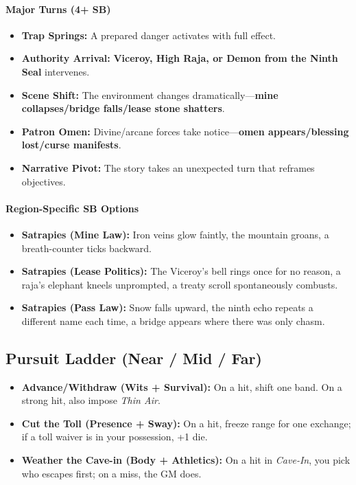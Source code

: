 \paragraph{Major Turns (4+ SB)}
\begin{itemize}
\item \textbf{Trap Springs:} A prepared danger activates with full effect.
\item \textbf{Authority Arrival:} \textbf{Viceroy, High Raja, or Demon from the Ninth Seal} intervenes.
\item \textbf{Scene Shift:} The environment changes dramatically—\textbf{mine collapses/bridge falls/lease stone shatters}.
\item \textbf{Patron Omen:} Divine/arcane forces take notice—\textbf{omen appears/blessing lost/curse manifests}.
\item \textbf{Narrative Pivot:} The story takes an unexpected turn that reframes objectives.
\end{itemize}

\paragraph{Region-Specific SB Options}
\begin{itemize}
\item \textbf{Satrapies (Mine Law):} Iron veins glow faintly, the mountain groans, a breath-counter ticks backward.
\item \textbf{Satrapies (Lease Politics):} The Viceroy's bell rings once for no reason, a raja's elephant kneels unprompted, a treaty scroll spontaneously combusts.
\item \textbf{Satrapies (Pass Law):} Snow falls upward, the ninth echo repeats a different name each time, a bridge appears where there was only chasm.
\end{itemize}

\subsection*{Pursuit Ladder (Near / Mid / Far)}
\begin{itemize}
\item \textbf{Advance/Withdraw (Wits + Survival):} On a hit, shift one band. On a strong hit, also impose \emph{Thin Air}.
\item \textbf{Cut the Toll (Presence + Sway):} On a hit, freeze range for one exchange; if a toll waiver is in your possession, +1 die.
\item \textbf{Weather the Cave-in (Body + Athletics):} On a hit in \emph{Cave-In}, you pick who escapes first; on a miss, the GM does.
\end{itemize}

